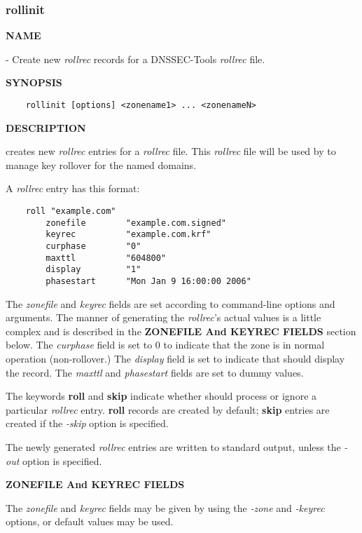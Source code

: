 \clearpage

\subsubsection{\bf rollinit}

{\bf NAME}

 - Create new {\it rollrec} records for a DNSSEC-Tools {\it rollrec} file.

{\bf SYNOPSIS}

\begin{verbatim}
    rollinit [options] <zonename1> ... <zonenameN>
\end{verbatim}

{\bf DESCRIPTION}

 creates new {\it rollrec} entries for a {\it rollrec} file.
This {\it rollrec} file will be used by  to manage key rollover
for the named domains.

A {\it rollrec} entry has this format:

\begin{verbatim}
    roll "example.com"
        zonefile        "example.com.signed"
        keyrec          "example.com.krf"
        curphase        "0"
        maxttl          "604800"
        display         "1"
        phasestart      "Mon Jan 9 16:00:00 2006"
\end{verbatim}

The {\it zonefile} and {\it keyrec} fields are set according to command-line
options and arguments.  The manner of generating the {\it rollrec}'s actual
values is a little complex and is described in the {\bf ZONEFILE And KEYREC
FIELDS} section below.  The {\it curphase} field is set to 0 to indicate that
the zone is in normal operation (non-rollover.)  The {\it display} field is
set to indicate that  should display the record.  The {\it
maxttl} and {\it phasestart} fields are set to dummy values.

The keywords {\bf roll} and {\bf skip} indicate whether  should
process or ignore a particular {\it rollrec} entry.  {\bf roll} records are
created by default; {\bf skip} entries are created if the {\it -skip} option
is specified.

The newly generated {\it rollrec} entries are written to standard output,
unless the {\it -out} option is specified.

{\bf ZONEFILE And KEYREC FIELDS}

The {\it zonefile} and {\it keyrec} fields may be given by using the
{\it -zone} and {\it -keyrec} options, or default values may be used.


